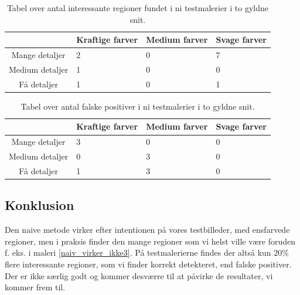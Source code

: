 \begin{table}[H]
    \centering
    \begin{tabular}{|c|l|l|l|}
			\hline
            & Kraftige farver & Medium farver & Svage farver \\\hline
		Mange detaljer	& 2 & 0 & 7 \\\hline
        Medium detaljer  & 1 & 0 & 0 \\\hline
        Få detaljer     & 1 & 0 & 1 \\\hline
    \end{tabular}
    \caption[]{Tabel over antal interessante regioner fundet i ni testmalerier i to gyldne snit.}
    \label{naiv_good}
\end{table}

\begin{table}[H]
    \centering
    \begin{tabular}{|c|l|l|l|}
			\hline
            & Kraftige farver & Medium farver & Svage farver \\\hline
		Mange detaljer	& 3 & 0 & 0 \\\hline
        Medium detaljer  & 0 & 3 & 0 \\\hline
        Få detaljer     & 1 & 3 & 0 \\\hline
    \end{tabular}
    \caption[]{Tabel over antal falske positiver i ni testmalerier i to gyldne snit.}
    \label{naiv_bad}
\end{table}

\subsection{Konklusion}
Den naive metode virker efter intentionen på vores testbilleder, med
ensfarvede regioner, men i praksis finder den mange regioner som vi helst
ville være foruden f. eks. i maleri \ref{naiv_virker_ikke3}. På
testmalerierne findes der altså kun $20\%$ flere interessante
regioner, som vi finder korrekt detekteret, end falske positiver. Der er
ikke særlig godt og kommer desværre til at påvirke de resultater, vi
kommer frem til.
